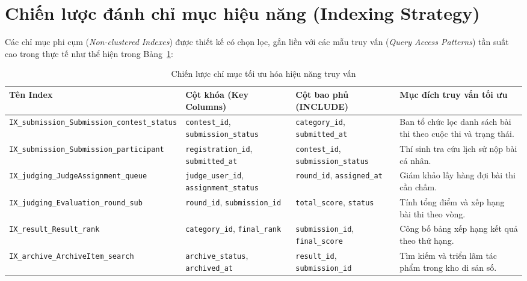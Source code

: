 \section{Chiến lược đánh chỉ mục hiệu năng (Indexing Strategy)}
\label{s:c5_indexes}

Các chỉ mục phi cụm (\textit{Non-clustered Indexes}) được thiết kế có chọn lọc, gắn liền với các mẫu truy vấn (\textit{Query Access Patterns}) tần suất cao trong thực tế như thể hiện trong Bảng~\ref{tab:c5_indexes}:

\begin{table}[!ht]
\centering
\caption{Chiến lược chỉ mục tối ưu hóa hiệu năng truy vấn}
\label{tab:c5_indexes}
\scriptsize
\begin{tabularx}{\textwidth}{>{\raggedright\arraybackslash}p{3.8cm}>{\raggedright\arraybackslash}p{2.6cm}>{\raggedright\arraybackslash}p{2.6cm}>{\raggedright\arraybackslash}X}
\toprule
\textbf{Tên Index} & \textbf{Cột khóa (Key Columns)} & \textbf{Cột bao phủ (INCLUDE)} & \textbf{Mục đích truy vấn tối ưu} \\
\midrule
\texttt{IX\_submission\_Submission\_contest\_status} & \texttt{contest\_id}, \texttt{submission\_status} & \texttt{category\_id}, \texttt{submitted\_at} & Ban tổ chức lọc danh sách bài thi theo cuộc thi và trạng thái. \\
\texttt{IX\_submission\_Submission\_participant} & \texttt{registration\_id}, \texttt{submitted\_at} & \texttt{contest\_id}, \texttt{submission\_status} & Thí sinh tra cứu lịch sử nộp bài cá nhân. \\
\texttt{IX\_judging\_JudgeAssignment\_queue} & \texttt{judge\_user\_id}, \texttt{assignment\_status} & \texttt{round\_id}, \texttt{assigned\_at} & Giám khảo lấy hàng đợi bài thi cần chấm. \\
\texttt{IX\_judging\_Evaluation\_round\_sub} & \texttt{round\_id}, \texttt{submission\_id} & \texttt{total\_score}, \texttt{status} & Tính tổng điểm và xếp hạng bài thi theo vòng. \\
\texttt{IX\_result\_Result\_rank} & \texttt{category\_id}, \texttt{final\_rank} & \texttt{submission\_id}, \texttt{final\_score} & Công bố bảng xếp hạng kết quả theo thứ hạng. \\
\texttt{IX\_archive\_ArchiveItem\_search} & \texttt{archive\_status}, \texttt{archived\_at} & \texttt{result\_id}, \texttt{submission\_id} & Tìm kiếm và triển lãm tác phẩm trong kho di sản số. \\
\bottomrule
\end{tabularx}
\end{table}

